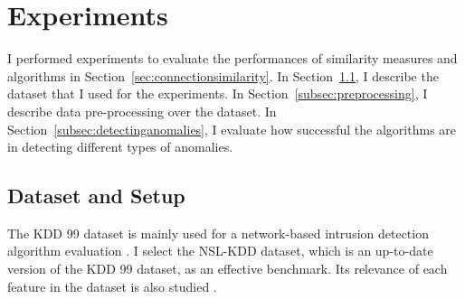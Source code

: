 \section{Experiments}
I performed experiments to evaluate the performances of similarity measures and algorithms in Section~\ref{sec:connectionsimilarity}.
\newline
In Section~\ref{subsec:datasetandsetup}, I describe the dataset that I used for the experiments.\newline
In Section~\ref{subsec:preprocessing}, I describe data pre-processing over the dataset.\newline
In Section~\ref{subsec:detectinganomalies}, I evaluate how successful the algorithms are in detecting different types of anomalies.

\subsection{Dataset and Setup}
\label{subsec:datasetandsetup}
The KDD 99 dataset is mainly used for a network-based intrusion detection algorithm evaluation \cite{tavallaee09}. 
I select the NSL-KDD dataset, which is an up-to-date version of the KDD 99 dataset, as an effective benchmark. 
Its relevance of each feature in the dataset is also studied \cite{olusola10} \cite{kayacik05}. 

